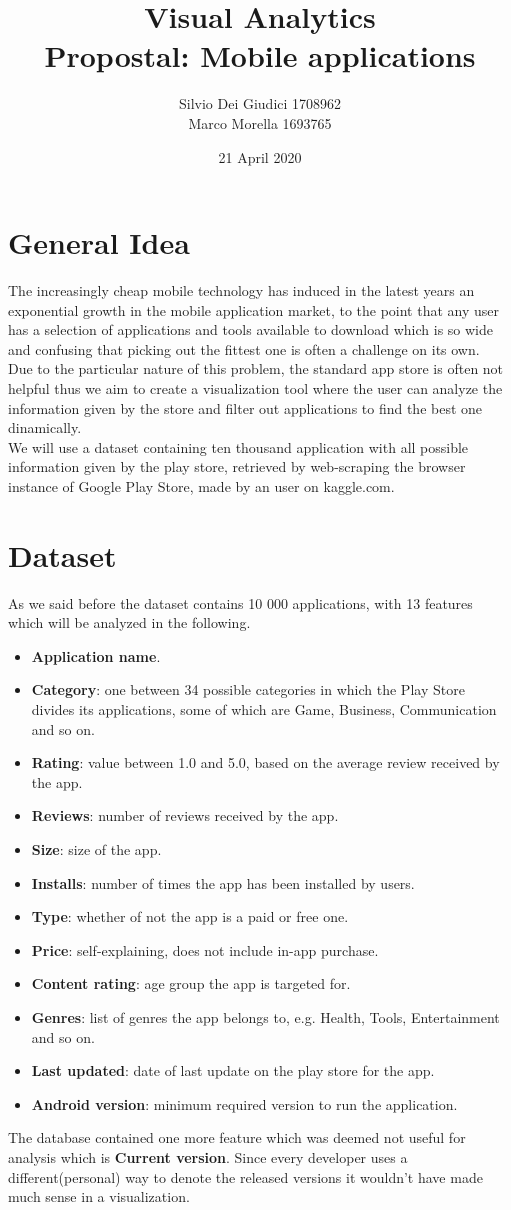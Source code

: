 \documentclass[a4paper, 11pt]{article}
\title { Visual Analytics\\ \bigskip \large Propostal: Mobile applications}
\date{21 April 2020}
\author{Silvio Dei Giudici 1708962 \\ Marco Morella 1693765}
\begin{document}
\maketitle

\section{General Idea}
The increasingly cheap mobile technology has induced in the latest years an exponential growth in the mobile application market, to the point that any user has a selection of applications and tools available to download which is so wide and confusing that picking out the fittest one is often a challenge on its own.\\
Due to the particular nature of this problem, the standard app store is often not helpful thus we aim to create a visualization tool where the user can analyze the information given by the store and filter out applications to find the best one dinamically.\\
We will use a dataset containing ten thousand application with all possible information given by the play store, retrieved by web-scraping the browser instance of Google Play Store, made by an user on kaggle.com.\\
\section{Dataset}
As we said before the dataset contains 10 000 applications, with 13 features which will be analyzed in the following.
\begin{itemize}
\item \textbf{Application name}.
\item \textbf{Category}: one between 34 possible categories in which the Play Store divides its applications, some of which are Game, Business, Communication and so on.
\item \textbf{Rating}: value between 1.0 and 5.0, based on the average review received by the app.
\item \textbf{Reviews}: number of reviews received by the app.
\item \textbf{Size}: size of the app.
\item \textbf{Installs}: number of times the app has been installed by users.
\item \textbf{Type}: whether of not the app is a paid or free one.
\item \textbf{Price}: self-explaining, does not include in-app purchase.
\item \textbf{Content rating}: age group the app is targeted for.
\item \textbf{Genres}: list of genres the app belongs to, e.g. Health, Tools, Entertainment and so on.
\item \textbf{Last updated}: date of last update on the play store for the app.
\item \textbf{Android version}: minimum required version to run the application.
\end{itemize}
The database contained one more feature which was deemed not useful for analysis which is \textbf{Current version}. Since every developer uses a different(personal) way to denote the released versions it wouldn't have made much sense in a visualization.
\end{document}
